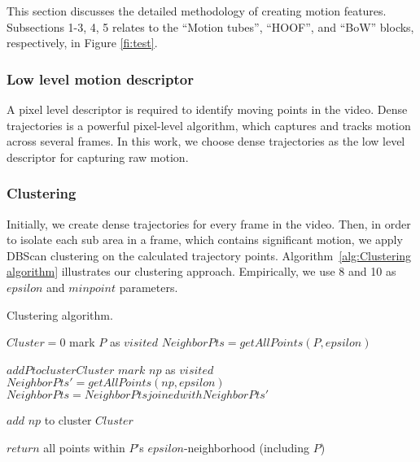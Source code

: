 This section discusses the detailed methodology of creating motion features. Subsections 1-3, 4, 5 relates to
the ``Motion tubes'', ``HOOF'', and ``BoW'' blocks, respectively, in Figure \ref{fi:test}.


\subsubsection{Low level motion descriptor}
A pixel level descriptor is required to identify moving points in the video. Dense trajectories \cite{wang2011action} is a powerful
pixel-level algorithm, which captures and tracks motion across several frames. In this work,
we choose dense trajectories as the low level descriptor for capturing raw motion.

\subsubsection{Clustering}

Initially, we create dense trajectories for every frame in the video.
Then, in order to isolate each sub area in a frame, which contains significant motion, we apply DBScan clustering on the
calculated trajectory points.
Algorithm~\ref{alg:Clustering algorithm}  illustrates our clustering approach. Empirically, we use 8 and 10 as $epsilon$ and $minpoint$ parameters.



\begin{algorithm*}
 \caption{Clustering algorithm.}
   \label{alg:Clustering algorithm}
    \begin{algorithmic}[1]
        \State $Cluster = 0$
	  \EndIf
            \State mark $P$ as $visited$
            \State $NeighborPts = getAllPoints(P, epsilon)$
          \Else
          \EndIf
        \EndFor
       \EndFunction

	\State $add P to cluster Cluster$
	    \State $mark$ $np$ as $visited$
	    \State $NeighborPts' = getAllPoints(np, epsilon)$
            \State $NeighborPts = NeighborPts joined with NeighborPts'$
            \EndIf
	
	  \EndIf
         \State $add$ $np$ to cluster $Cluster$
         \EndIf
	\EndFor
       \EndFunction

       \State $return$ all points within $P$'s $epsilon$-neighborhood (including $P$)
       \EndFunction
\end{algorithmic}

\end{algorithm*}


